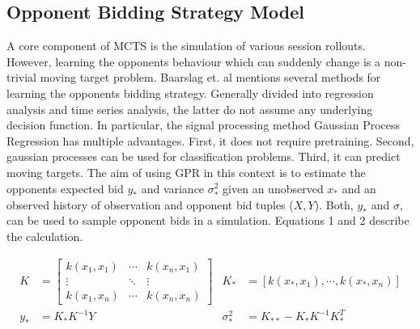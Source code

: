 \documentclass[a4paper,11pt]{article}
\theoremstyle{mytheor}
\begin{document}
\subsection{Opponent Bidding Strategy Model}
\label{sec:OBS}
A core component of MCTS is the simulation of various session rollouts. However, learning the opponents behaviour which can suddenly change is a non-trivial moving target problem.\cite{Baarslag2016} Baarslag et. al mentions several methods for learning the opponents bidding strategy.\cite{Baarslag2016} Generally divided into regression analysis and time series analysis, the latter do not assume any underlying decision function.
In particular, the signal processing method Gaussian Process Regression has multiple advantages. First, it does not require pretraining. Second, gaussian processes can be used for classification problems. Third, it can predict moving targets. 
The aim of using GPR in this context is to estimate the opponents expected bid $y_*$ and variance $\sigma_*^2$ given an unobserved $x_*$ and an observed history of observation and opponent bid tuples ($X,Y$). Both, $y_*$ and $\sigma$, can be used to sample opponent bids in a simulation. Equations 1 and 2 describe the calculation.\cite{Buron_Guessoum_Ductor_2019}

\begin{align}
    \label{eq:GPR}
    K &= \begin{bmatrix}
    k(x_1,x_1)&\cdots &k(x_n,x_1) \\
    \vdots & \ddots & \vdots\\
    k(x_1,x_n)&\cdots &k(x_n,x_n)
    \end{bmatrix} & K_* &= [k(x_*,x_1), \cdots, k(x_*,x_n)]\\
    y_* &= K_*K^{-1}Y &\sigma_*^2 &= K_{**} - K_* K^{-1} K_*^T
\end{align}
\end{document}
